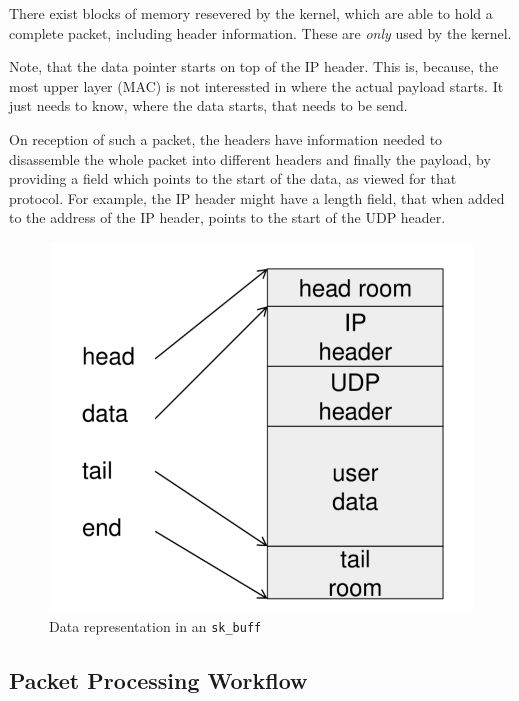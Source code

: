 \documentclass[english]{panikzettel}
\begin{document}
	
	\begin{halfboxl}
		There exist blocks of memory resevered by the kernel, which are able to hold a complete packet, including header information.
		These are \textit{only} used by the kernel.

		Note, that the data pointer starts on top of the IP header. 
		This is, because, the most upper layer (MAC) is not interessted in where the actual payload starts. 
		It just needs to know, where the data starts, that needs to be send.

		On reception of such a packet, the headers have information needed to disassemble the whole packet into different headers and finally the payload, by providing a field which points to the start of the data, as viewed for that protocol. 
		For example, the IP header might have a length field, that when added to the address of the IP header, points to the start of the UDP header.
	\end{halfboxl}%
	\begin{halfboxr}
		\vspace{-\baselineskip}
		\begin{figure}[H]
			\centering
			\includegraphics[width=\textwidth]{img/3-data-skbuff.png}
			\caption{Data representation in an \texttt{sk\_buff}}
			\label{img-3-data-skbuff}
		\end{figure}
	\end{halfboxr}
	
	\subsection{Packet Processing Workflow}
	\label{ss-protocol-processing-workflow}
	
\end{document}

